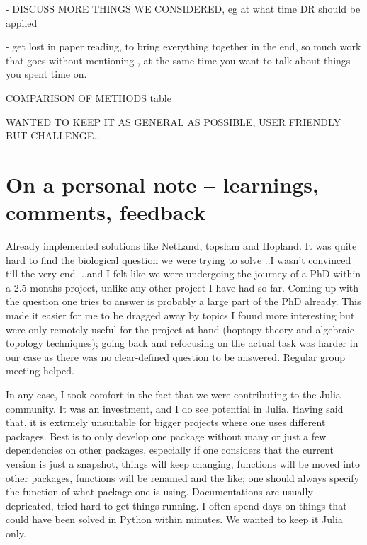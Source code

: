 \documentclass[journal, a4paper]{IEEEtran}
\begin{document}
- DISCUSS MORE THINGS WE CONSIDERED, eg at what time DR should be applied

- get lost in paper reading, to bring everything together in the end, so much work that goes without mentioning , at the same time you want to talk about things you spent time on.

COMPARISON OF METHODS
table

WANTED TO KEEP IT AS GENERAL AS POSSIBLE, USER FRIENDLY BUT CHALLENGE..



\section{On a personal note -- learnings, comments, feedback } %


Already implemented solutions like NetLand, topslam and Hopland. It was quite hard to find the biological question we were trying to solve ..I wasn't convinced till the very end. ..and I felt like we were undergoing the journey of a PhD within a 2.5-months project, unlike any other project I have had so far. Coming up with the question one tries to answer is probably a large part of the PhD already. 
This made it easier for me to be dragged away by topics I found more interesting but were only remotely useful for the project at hand (hoptopy theory and algebraic topology techniques); going back and refocusing on the actual task was harder in our case as there was no clear-defined question to be answered. Regular group meeting helped. 

In any case, I took comfort in the fact that we were contributing to the Julia community. It was an investment, and I do see potential in Julia. Having said that, it is extrmely unsuitable for bigger projects where one uses different packages. Best is to only develop one package without many or just a few dependencies on other packages, especially if one considers that the current version is just a snapshot, things will keep changing, functions will be moved into other packages, functions will be renamed and the like; one should always specify the function of what package one is using. Documentations are usually depricated, tried hard to get things running. I often spend days on things that could have been solved in Python within minutes. We wanted to keep it Julia only.
\end{document}
